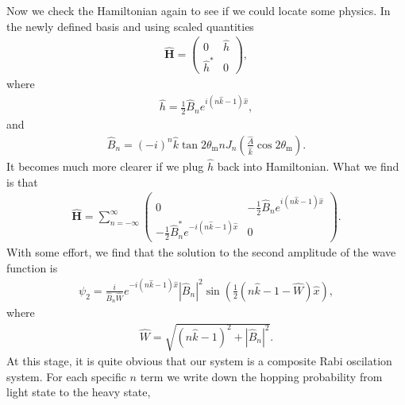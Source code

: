 \documentclass[letterpaper,12pt,english]{sphinxmanual}
\begin{document}
Now we check the Hamiltonian again to see if we could locate some physics. In the newly defined basis and using scaled quantities
\begin{equation*}
\begin{split}\hat{\mathbf{H}} = \begin{pmatrix}
0 & \hat h \\
\hat h^* & 0
\end{pmatrix},\end{split}
\end{equation*}
where
\begin{equation*}
\begin{split}\hat h = \frac{1}{2} \hat B_n e^{i(n \hat k - 1)\hat x},\end{split}
\end{equation*}
and
\begin{equation*}
\begin{split}\hat B_n = (-i)^n \hat k \tan 2\theta_{\mathrm{m}} n J_n (\frac{\hat A}{\hat k} \cos 2\theta_{\mathrm{m}}).\end{split}
\end{equation*}
It becomes much more clearer if we plug \(\hat h\) back into Hamiltonian. What we find is that
\begin{equation*}
\begin{split}\hat{\mathbf{H}} = \sum_{n=-\infty}^{\infty} \begin{pmatrix}
0 & -\frac{1}{2} \hat B_n e^{i(n \hat k - 1)\hat x} \\
-\frac{1}{2} \hat B_n^* e^{-i(n \hat k - 1)\hat x} & 0
\end{pmatrix}.\end{split}
\end{equation*}
With some effort, we find that the solution to the second amplitude of the wave function is
\begin{equation*}
\begin{split}\psi_2 = \frac{i}{ \hat B_n \hat W} e^{-i(n \hat k -1)\hat x}  \left\vert \hat B_n \right\vert^2 \sin\left( \frac{1}{2}(n \hat k -1 -\hat W) \hat x  \right),\end{split}
\end{equation*}
where
\begin{equation*}
\begin{split}\hat W = \sqrt{ (n \hat k - 1)^2 + \left\vert \hat B_n \right\vert^2 }.\end{split}
\end{equation*}
At this stage, it is quite obvious that our system is a composite Rabi oscilation system. For each specific \(n\) term we write down the hopping probability from light state to the heavy state,
\end{document}

